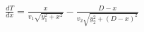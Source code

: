 \documentclass[preview]{standalone}
\begin{document}
\begin{align*}
\frac{dT}{dx} = \frac{x}{v_1\sqrt{y_1^2 + x^2}} - \frac{D-x}{v_2\sqrt{y_2^2 + (D-x)^2}}
\end{align*}
\end{document}
